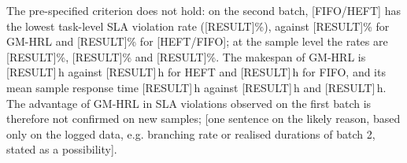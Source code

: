 The pre-specified criterion does not hold: on the second batch, [FIFO/HEFT] has the lowest task-level SLA violation rate ([RESULT]\%), against [RESULT]\% for GM-HRL and [RESULT]\% for [HEFT/FIFO]; at the sample level the rates are [RESULT]\%, [RESULT]\% and [RESULT]\%. The makespan of GM-HRL is [RESULT]\,h against [RESULT]\,h for HEFT and [RESULT]\,h for FIFO, and its mean sample response time [RESULT]\,h against [RESULT]\,h and [RESULT]\,h. The advantage of GM-HRL in SLA violations observed on the first batch is therefore not confirmed on new samples; [one sentence on the likely reason, based only on the logged data, e.g. branching rate or realised durations of batch 2, stated as a possibility].




